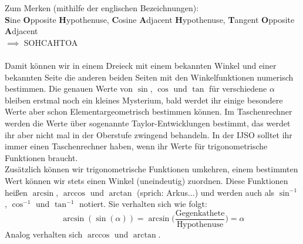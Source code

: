 \documentclass[11pt]{article}
\begin{document}
Zum Merken (mithilfe der englischen Bezeichnungen): \\
\textbf{S}ine \textbf{O}pposite \textbf{H}ypothenuse, \textbf{C}osine \textbf{A}djacent \textbf{H}ypothenuse, \textbf{T}angent \textbf{O}pposite \textbf{A}djacent \\
$\implies$ SOHCAHTOA \\\\
Damit können wir in einem Dreieck mit einem bekannten Winkel und einer bekannten Seite die anderen beiden Seiten mit den Winkelfunktionen numerisch bestimmen. Die genauen Werte von $\sin$, $\cos$ und $\tan$ für verschiedene $\alpha$ bleiben erstmal noch ein kleines Mysterium, bald werdet ihr einige besondere Werte aber schon Elementargeometrisch bestimmen können. Im Taschenrechner werden die Werte über sogenannte Taylor-Entwicklungen bestimmt, das werdet ihr aber nicht mal in der Oberstufe zwingend behandeln. In der IJSO solltet ihr immer einen Taschenrechner haben, wenn ihr Werte für trigonometrische Funktionen braucht. \\

Zusätzlich können wir trigonometrische Funktionen umkehren, einem bestimmten Wert können wir stets einen Winkel (uneindeutig) zuordnen. Diese Funktionen heißen $\arcsin$, $\arccos$ und $\arctan$ (sprich: Arkus...) und werden auch als $\sin^{-1}$, $\cos^{-1}$ und $\tan^{-1}$ notiert. Sie verhalten sich wie folgt: 
$$\arcsin(\sin(\alpha)) = \arcsin\bigg(\frac{\text{Gegenkathete}}{\text{Hypothenuse}}\bigg) = \alpha$$
Analog verhalten sich $\arccos$ und $\arctan$.
\end{document}
